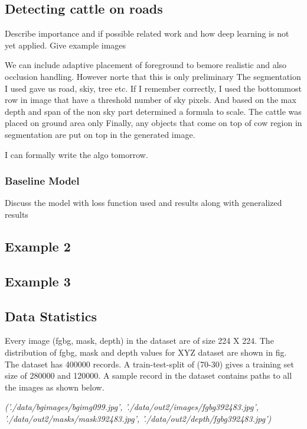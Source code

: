 \documentclass[review]{cvpr}
\begin{document}
\subsection{Detecting cattle on roads}
Describe importance and if possible related work and how deep learning is not yet applied.
Give example images


We can include adaptive placement of foreground to bemore realistic and also occlusion handling. However norte that this is only preliminary
The segmentation I used gave us road, skiy, tree etc. If I remember correctly, I used the bottommost row in image that have a threshold number of
sky pixels. And based on the max depth and span of the non sky part determined a formula to scale. The cattle was placed on ground area only
Finally, any objects that come on top of cow region in segmentation are put on top in the generated image.

I can formally write the algo tomorrow.

\subsubsection{Baseline Model}
Discuss the model with loss function used and results along with generalized results

\subsection{Example 2} %

\subsection{Example 3} %




\subsection{Data Statistics}
Every image (fgbg, mask, depth) in the dataset are of size 224 X 224. 
The distribution of fgbg, mask and depth values for XYZ dataset are shown in fig. 
The dataset has 400000 records. A train-test-split of (70-30) gives a training set size of 280000 and 120000. 
A sample record in the dataset contains paths to all the images as shown below.

\textit{('./data/bgimages/bgimg099.jpg', 
'./data/out2/images/fgbg392483.jpg', 
'./data/out2/masks/mask392483.jpg', 
'./data/out2/depth/fgbg392483.jpg')}
\end{document}
